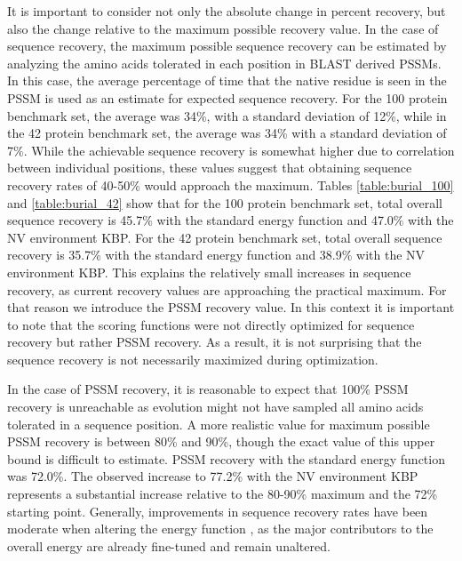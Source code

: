 It is important to consider not only the absolute change in percent recovery, but also the change relative to the maximum possible recovery value.
In the case of sequence recovery, the maximum possible sequence recovery can be estimated by analyzing the amino acids tolerated in each position in \ac{BLAST} derived \ac{PSSM}s.
In this case, the average percentage of time that the native residue is seen in the \ac{PSSM} is used as an estimate for expected sequence recovery.
For the 100 protein benchmark set, the average was 34\%, with a standard deviation of 12\%, while in the 42 protein benchmark set, the average was 34\% with a standard deviation of 7\%.
While the achievable sequence recovery is somewhat higher due to correlation between individual positions, these values suggest that obtaining sequence recovery rates of 40-50\% would approach the maximum.
Tables \ref{table:burial_100} and \ref{table:burial_42} show that for the 100 protein benchmark set, total overall sequence recovery is 45.7\% with the standard energy function and 47.0\% with the \ac{NV} environment \ac{KBP}.
For the 42 protein benchmark set, total overall sequence recovery is 35.7\% with the standard energy function and 38.9\% with the \ac{NV} environment \ac{KBP}.
This explains the relatively small increases in sequence recovery, as current recovery values are approaching the practical maximum.
For that reason we introduce the \ac{PSSM} recovery value.
In this context it is important to note that the scoring functions were not directly optimized for sequence recovery but rather \ac{PSSM} recovery.
As a result, it is not surprising that the sequence recovery is not necessarily maximized during optimization. 

In the case of \ac{PSSM} recovery, it is reasonable to expect that 100\% \ac{PSSM} recovery is unreachable as evolution might not have sampled all amino acids tolerated in a sequence position.
A more realistic value for maximum possible \ac{PSSM} recovery is between 80\% and 90\%, though the exact value of this upper bound is difficult to estimate. \ac{PSSM} recovery with the standard energy function was 72.0\%.
The observed increase to 77.2\% with the \ac{NV} environment \ac{KBP} represents a substantial increase relative to the 80-90\% maximum and the 72\% starting point.
Generally, improvements in sequence recovery rates have been moderate when altering the energy function \citep{Kortemme:2003td}, as the major contributors to the overall energy are already fine-tuned and remain unaltered. 

